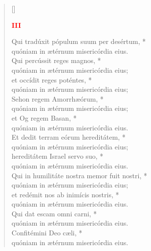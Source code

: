 \begin{verse}[\versewidth]
\begin{center}
\textcolor{red}{\bf III}
\end{center}
Qui tradúxit pópulum suum per desértum, *\\
quóniam in ætérnum misericórdia eius.\\
\vin Qui percússit reges magnos, *\\
\vin quóniam in ætérnum misericórdia eius;\\
et occídit reges poténtes, *\\
quóniam in ætérnum misericórdia eius;\\
\vin Sehon regem Amorrhæórum, *\\
\vin quóniam in ætérnum misericórdia eius;\\
et Og regem Basan, *\\
quóniam in ætérnum misericórdia eius.\\
\vin Et dedit terram eórum hereditátem, *\\
\vin quóniam in ætérnum misericórdia eius;\\
hereditátem Israel servo suo, *\\
quóniam in ætérnum misericórdia eius.\\
\vin Qui in humilitáte nostra memor fuit nostri, *\\
\vin quóniam in ætérnum misericórdia eius;\\
et redémit nos ab inimícis nostris, *\\
quóniam in ætérnum misericórdia eius.\\
\vin Qui dat escam omni carni, *\\
\vin quóniam in ætérnum misericórdia eius.\\
Confitémini Deo cæli, *\\
quóniam in ætérnum misericórdia eius.\\
\end{verse}
\vspace{1cm}


